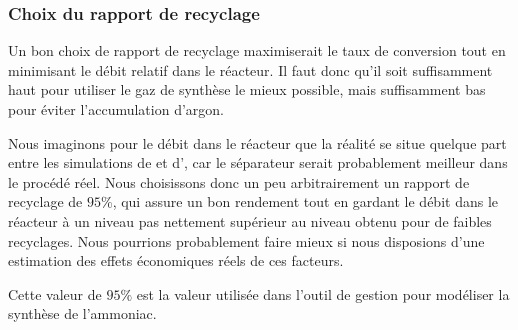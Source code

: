 \subsubsection{Choix du rapport de recyclage}

Un bon choix de rapport de recyclage maximiserait le taux de conversion
tout en minimisant le débit relatif dans le réacteur.
Il faut donc qu'il soit suffisamment haut pour utiliser le gaz de synthèse
le mieux possible, mais suffisamment bas pour éviter l'accumulation d'argon.

Nous imaginons pour le débit dans le réacteur
que la réalité se situe quelque part entre les simulations de \matlab{}
et d'\aspen{}, car le séparateur serait probablement meilleur
dans le procédé réel.
Nous choisissons donc un peu arbitrairement un rapport de recyclage de $95\%$,
qui assure un bon rendement tout en gardant le débit dans le réacteur à un
niveau pas nettement supérieur au niveau obtenu pour de faibles recyclages.
Nous pourrions probablement faire mieux si nous disposions d'une estimation
des effets économiques réels de ces facteurs.

Cette valeur de $95\%$ est la valeur utilisée dans l'outil de gestion
pour modéliser la synthèse de l'ammoniac.
